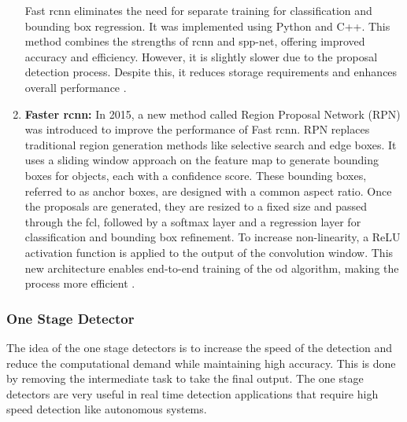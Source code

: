 \begin{enumerate}
    Fast \gls{rcnn} eliminates the need for separate training for classification and bounding box regression. It was implemented using Python and C++. This method combines the strengths of \gls{rcnn} and \gls{spp-net}, offering improved accuracy and efficiency. However, it is slightly slower due to the proposal detection process. Despite this, it reduces storage requirements and enhances overall performance \cite{oD_Review}.


    \item \textbf{Faster \gls{rcnn}:} In 2015, a new method called Region Proposal Network (RPN) was introduced to improve the performance of Fast \gls{rcnn}. RPN replaces traditional region generation methods like selective search and edge boxes. It uses a sliding window approach on the feature map to generate bounding boxes for objects, each with a confidence score. These bounding boxes, referred to as anchor boxes, are designed with a common aspect ratio. Once the proposals are generated, they are resized to a fixed size and passed through the \gls{fcl}, followed by a softmax layer and a regression layer for classification and bounding box refinement. To increase non-linearity, a ReLU activation function is applied to the output of the convolution window. This new architecture enables end-to-end training of the \gls{od} algorithm, making the process more efficient \cite{oD_Review}.
\end{enumerate}

\subsubsection{One Stage Detector}
The idea of the one stage detectors is to increase the speed of the detection and reduce the computational demand while maintaining high accuracy. This is done by removing the intermediate task to take the final output. The one stage detectors are very useful in real time detection applications that require high speed detection like autonomous systems.

